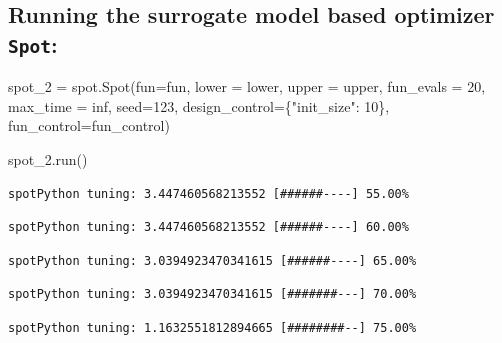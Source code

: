 \documentclass[
  letterpaper,
  DIV=11,
  numbers=noendperiod]{scrreprt}
\newenvironment{Shaded}{\begin{snugshade}}{\end{snugshade}}
\newcommand{\DecValTok}[1]{\textcolor[rgb]{0.68,0.00,0.00}{#1}}
\newcommand{\NormalTok}[1]{\textcolor[rgb]{0.00,0.23,0.31}{#1}}
\newcommand{\OperatorTok}[1]{\textcolor[rgb]{0.37,0.37,0.37}{#1}}
\newcommand{\StringTok}[1]{\textcolor[rgb]{0.13,0.47,0.30}{#1}}
\begin{document}
\hypertarget{running-the-surrogate-model-based-optimizer-spot}{%
\subsection{\texorpdfstring{Running the surrogate model based optimizer
\texttt{Spot}:}{Running the surrogate model based optimizer Spot:}}\label{running-the-surrogate-model-based-optimizer-spot}}

\begin{Shaded}
\begin{Highlighting}[]
\NormalTok{spot\_2 }\OperatorTok{=}\NormalTok{ spot.Spot(fun}\OperatorTok{=}\NormalTok{fun,}
\NormalTok{                   lower }\OperatorTok{=}\NormalTok{ lower,}
\NormalTok{                   upper }\OperatorTok{=}\NormalTok{ upper,}
\NormalTok{                   fun\_evals }\OperatorTok{=} \DecValTok{20}\NormalTok{,}
\NormalTok{                   max\_time }\OperatorTok{=}\NormalTok{ inf,}
\NormalTok{                   seed}\OperatorTok{=}\DecValTok{123}\NormalTok{,}
\NormalTok{                   design\_control}\OperatorTok{=}\NormalTok{\{}\StringTok{"init\_size"}\NormalTok{: }\DecValTok{10}\NormalTok{\},}
\NormalTok{                   fun\_control}\OperatorTok{=}\NormalTok{fun\_control)}
\end{Highlighting}
\end{Shaded}

\begin{Shaded}
\begin{Highlighting}[]
\NormalTok{spot\_2.run()}
\end{Highlighting}
\end{Shaded}

\begin{verbatim}
spotPython tuning: 3.447460568213552 [######----] 55.00% 
\end{verbatim}

\begin{verbatim}
spotPython tuning: 3.447460568213552 [######----] 60.00% 
\end{verbatim}

\begin{verbatim}
spotPython tuning: 3.0394923470341615 [######----] 65.00% 
\end{verbatim}

\begin{verbatim}
spotPython tuning: 3.0394923470341615 [#######---] 70.00% 
\end{verbatim}

\begin{verbatim}
spotPython tuning: 1.1632551812894665 [########--] 75.00% 
\end{verbatim}
\end{document}
